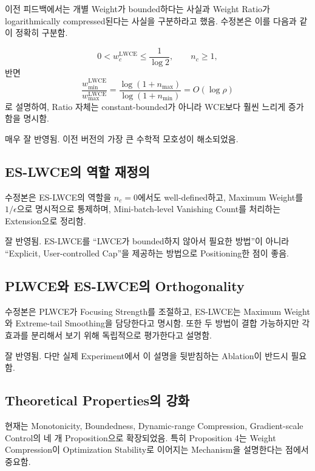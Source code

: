 \documentclass[11pt,a4paper]{article}
\begin{document}
이전 피드백에서는 개별 Weight가 bounded하다는 사실과 Weight Ratio가 logarithmically compressed된다는 사실을 구분하라고 했음. 수정본은 이를 다음과 같이 정확히 구분함.

\[
0<w_c^{\mathrm{LWCE}}\leq \frac{1}{\log 2},
\qquad n_c\geq 1,
\]
반면
\[
\frac{w_{\min}^{\mathrm{LWCE}}}{w_{\max}^{\mathrm{LWCE}}}
=
\frac{\log(1+n_{\max})}{\log(1+n_{\min})}
=
O(\log \rho)
\]
로 설명하여, Ratio 자체는 constant-bounded가 아니라 WCE보다 훨씬 느리게 증가함을 명시함.

\begin{tcolorbox}[title=반영 평가]
매우 잘 반영됨. 이전 버전의 가장 큰 수학적 모호성이 해소되었음.
\end{tcolorbox}

\subsection{ES-LWCE의 역할 재정의}

수정본은 ES-LWCE의 역할을 \(n_c=0\)에서도 well-defined하고, Maximum Weight를 \(1/\epsilon\)으로 명시적으로 통제하며, Mini-batch-level Vanishing Count를 처리하는 Extension으로 정리함.

\begin{tcolorbox}[title=반영 평가]
잘 반영됨. ES-LWCE를 ``LWCE가 bounded하지 않아서 필요한 방법''이 아니라 ``Explicit, User-controlled Cap''을 제공하는 방법으로 Positioning한 점이 좋음.
\end{tcolorbox}

\subsection{PLWCE와 ES-LWCE의 Orthogonality}

수정본은 PLWCE가 Focusing Strength를 조절하고, ES-LWCE는 Maximum Weight와 Extreme-tail Smoothing을 담당한다고 명시함. 또한 두 방법이 결합 가능하지만 각 효과를 분리해서 보기 위해 독립적으로 평가한다고 설명함.

\begin{tcolorbox}[title=반영 평가]
잘 반영됨. 다만 실제 Experiment에서 이 설명을 뒷받침하는 Ablation이 반드시 필요함.
\end{tcolorbox}

\subsection{Theoretical Properties의 강화}

현재는 Monotonicity, Boundedness, Dynamic-range Compression, Gradient-scale Control의 네 개 Proposition으로 확장되었음. 특히 Proposition 4는 Weight Compression이 Optimization Stability로 이어지는 Mechanism을 설명한다는 점에서 중요함.
\end{document}

